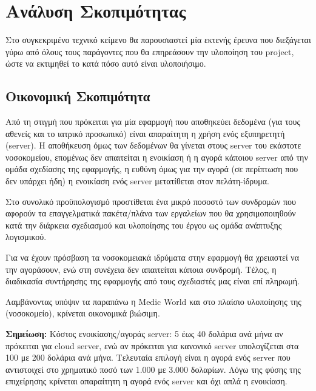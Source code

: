 \documentclass{article}
\begin{document}
{
  \hypersetup{linkcolor=black}
  \tableofcontents
}

\section{Ανάλυση Σκοπιμότητας}

Στο συγκεκριμένο τεχνικό κείμενο θα παρουσιαστεί μία εκτενής έρευνα που διεξάγεται γύρω από όλους τους παράγοντες που θα επηρεάσουν την υλοποίηση του project, ώστε να εκτιμηθεί το κατά πόσο αυτό είναι υλοποιήσιμο.

\subsection{Οικονομική Σκοπιμότητα}

Από τη στιγμή που πρόκειται για μία εφαρμογή που αποθηκεύει δεδομένα (για τους αθενείς και το ιατρικό προσωπικό) είναι απαραίτητη η χρήση ενός εξυπηρετητή (server). Η αποθήκευση όμως των δεδομένων θα γίνεται στους server του εκάστοτε νοσοκομείου, επομένως δεν απαιτείται η ενοικίαση ή η αγορά κάποιου server από την ομάδα σχεδίασης της εφαρμογής, η ευθύνη όμως για την αγορά (σε περίπτωση που δεν υπάρχει ήδη) η ενοικίαση ενός server μετατίθεται στον πελάτη-ίδρυμα.  \newline \par

Στο συνολικό προϋπολογισμό προστίθεται ένα μικρό ποσοστό των συνδρομών που αφορούν τα επαγγελματικά πακέτα/πλάνα των εργαλείων που θα χρησιμοποιηθούν κατά την διάρκεια σχεδιασμού και υλοποίησης του έργου ως ομάδα ανάπτυξης λογισμικού. \newline\par

Για να έχουν πρόσβαση τα νοσοκομειακά ιδρύματα στην εφαρμογή θα χρειαστεί να την αγοράσουν, ενώ στη συνέχεια δεν απαιτείται κάποια συνδρομή. Τέλος, η διαδικασία συντήρησης της εφαρμογής από τους σχεδιαστές μας είναι επί πληρωμή. \newline \par

Λαμβάνοντας υπόψιν τα παραπάνω η Medic World και στο πλαίσιο υλοποίησης της (νοσοκομείο), κρίνεται οικονομικά βιώσιμη. \newline \par

\textbf{Σημείωση:} Κόστος ενοικίασης/αγοράς server: 5 έως 40 δολάρια ανά μήνα αν πρόκειται για cloud server, ενώ αν πρόκειται για κανονικό server υπολογίζεται στα 100 με 200 δολάρια ανά μήνα. Τελευταία επιλογή είναι η αγορά ενός server που αντιστοιχεί στο χρηματικό ποσό των 1.000 με 3.000 δολαρίων. Λόγω της φύσης της επιχείρησης κρίνεται απαραίτητη η αγορά ενός server και όχι απλά η ενοικίαση.
\end{document}
